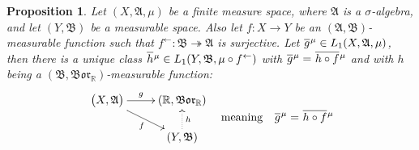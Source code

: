 \documentclass[
twoside=true,
paper=letter,
fontsize=11pt,
pagesize=auto,
leqno,
openany,
headsepline,
overfullrule,
]{scrbook}
\theoremstyle{plain}
\theoremstyle{plain}
\newtheorem{prop}[thm]{Proposition}
\theoremstyle{definition}
\theoremstyle{bfnoteitalic}
\theoremstyle{bfnoteroman}
\newcommand{\sigalg}[1]{\mathfrak{#1}}
\newcommand{\borel}{\mathfrak{Bor}}
\newcommand{\textsigma}{\hbox{\large{$\sigma$}}\kern-1pt}
\newcommand{\preimage}[1]{#1^{\leftarrow}}
\newcommand{\R}{\mathbb{R}}
\newcommand{\sigmaalgebra}{\sigalg{A}}
\newcommand{\sigmaalgebraii}{\sigalg{B}}
\newcommand{\measurespace}{X}
\newcommand{\measurespaceii}{Y}
\newcommand{\measure}{\mu}
\newcommand*\xbar[1]{%
   \hbox{%
     \vbox{%
       \hrule height 0.4pt %
       \kern0.4ex%
       \hbox{%
         \ensuremath{#1}%
       }%
     }%
   }%
}
\newcommand{\lebclass}[1]{\hspace{.5pt}\xbar{#1}\hspace{0.5pt}}
\newcommand{\ellclass}[2]{\lebclass{#1}^{#2}}
\begin{document}
\begin{prop}\label{factoring_functions}
Let $(\measurespace, \sigmaalgebra, \measure)$  be a finite measure space, where $\sigmaalgebra$ is a \textsigma-algebra, and let $(\measurespaceii, \sigmaalgebraii)$ be a measurable space.
Also let $f:\measurespace\to\measurespaceii$ be an $(\sigmaalgebra, \sigmaalgebraii)$\hyp{}measurable function such that 
$\preimage{f}:\sigmaalgebraii \twoheadrightarrow\sigmaalgebra$ is surjective.
Let
$\ellclass{g}{\measure}
\in L_1(\measurespace, \sigmaalgebra, \measure)$,
then there is a unique class
$\ellclass{h}{\measure}
\in L_1 (\measurespaceii, \sigmaalgebraii, \measure\circ\preimage{f})$
with 
$\ellclass{g}{\measure} 
= 
\ellclass{h\circ f}{\measure}$
and with $h$ being a $(\sigmaalgebraii, \borel_\R)$\hyp{}measurable function:
\[
\begin{gathered}
\xymatrix@R=16pt{ 
\bigl( \measurespace, \sigmaalgebra \bigr) \ar[r]^-{g} 
\ar[dr]_{f}
&
(\R,\borel_\R)  
\\
&
(\measurespaceii, \sigmaalgebraii) \ar@{.>}[u]_{h}
\\
}
\end{gathered}
\quad
\text{meaning}
\quad
\ellclass{g}{\measure}=\ellclass{h\circ f}{\measure}
\]
\end{prop}
\end{document}
